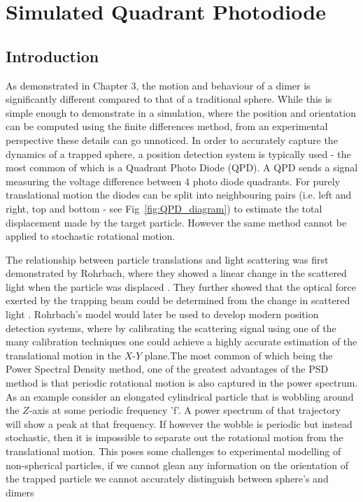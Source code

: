 \chapter{Simulated Quadrant Photodiode}
\label{chapter:simulated_QPD}

\section{Introduction}
As demonstrated in Chapter 3, the motion and behaviour of a dimer 
is significantly different compared to that of a traditional sphere.
While this is simple enough to demonstrate in a simulation, where the 
position and orientation can be computed using the finite differences
method, from an experimental perspective these details can go unnoticed.
In order to accurately capture the dynamics of a trapped sphere, a 
position detection system is typically used - the most common of which is 
a Quadrant Photo Diode (QPD). A QPD sends a signal measuring 
the voltage difference between 4 photo diode quadrants. For purely 
translational motion the diodes can be split into neighbouring pairs 
(i.e. left and right, top and bottom - see Fig~\ref{fig:QPD_diagram})
to estimate the total displacement made by the target particle. 
However the same method cannot be applied to stochastic rotational 
motion. 

The relationship between particle translations and light scattering 
was first demonstrated by Rohrbach, where they showed a linear change 
in the scattered light when the particle was displaced \cite{Rohrbach2002}. They further showed that the optical force exerted by the trapping 
beam could be determined from the change in scattered light \cite{Rohrbach2002}. Rohrbach's model would later be used to develop 
modern position detection systems, where by calibrating the scattering 
signal using one of the many calibration techniques one could achieve a highly accurate estimation of the translational motion in the $X$-$Y$ 
plane.The most common of which being the Power Spectral Density method, 
one of the greatest advantages of the PSD method is that periodic 
rotational motion is also captured in the power spectrum. As an 
example consider an elongated cylindrical particle that is wobbling
around the $Z$-axis at some periodic frequency 'f'. A power spectrum 
of that trajectory will show a peak at that frequency. If however the 
wobble is periodic but instead stochastic, then it is impossible to 
separate out the rotational motion from the translational motion. This
poses some challenges to experimental modelling of non-spherical 
particles, if we cannot glean any information on the orientation
of the trapped particle we cannot accurately distinguish between
sphere's and dimers 

